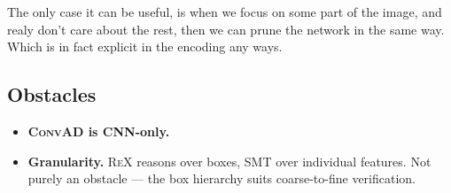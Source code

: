 \documentclass[11pt,a4paper]{article}
\newcommand{\rex}{\textsc{ReX}}
\newcommand{\convad}{\textsc{ConvAD}}
\newcommand{\ad}{\textsc{AD}}
\begin{document}
The only case it can be useful, is when we focus on some part of the image, and realy don't care about the rest, then we can prune the network in the same way. Which is in fact explicit in the encoding any ways.

\subsection*{Obstacles}

\begin{itemize}[leftmargin=1.2em]
\item \textbf{\convad{} is CNN-only.} 
\item \textbf{Granularity.} \rex{} reasons over boxes, SMT over individual
features. Not purely an obstacle --- the box hierarchy suits coarse-to-fine
verification.
\end{itemize}




\end{document}
